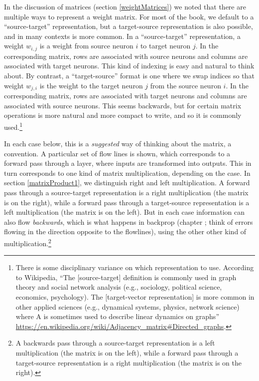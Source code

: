 In the discussion of matrices (section \ref{weightMatrices}) we noted that there are multiple ways to represent a weight matrix. For most of the book, we default to a ``source-target'' representation, but a target-source representation is also possible, and in many contexts is more common. In a ``source-target'' representation, a weight $w_{i, j}$ is a weight from source neuron $i$ to target neuron $j$. In the corresponding matrix, rows are associated with source neurons and columns are associated with target neurons. This kind of indexing is easy and natural to think about. By contrast, a ``target-source'' format is one where we swap indices so that weight $w_{j, i}$ is the weight to the target neuron $j$ from the source neuron $i$. In the corresponding matrix, rows are associated with target neurons and columns are associated with source neurons. This seems backwards, but for certain matrix operations is more natural and more compact to write, and so it is commonly used.\footnote{There is some disciplinary variance on which representation to use. According to Wikipedia, ``The [source-target] definition is commonly used in graph theory and social network analysis (e.g., sociology, political science, economics, psychology). The [target-vector representation] is more common in other applied sciences (e.g., dynamical systems, physics, network science) where A is sometimes used to describe linear dynamics on graphs'' \url{https://en.wikipedia.org/wiki/Adjacency_matrix\#Directed_graphs}.}

In each case below, this is a \emph{suggested} way of thinking about the matrix, a convention. A particular set of flow lines is shown, which corresponds to a forward pass through a layer, where inputs are transformed into outputs. This in turn corresponds to one kind of matrix multiplication, depending on the case. In section \ref{matrixProduct1}, we distinguish right and left multiplication. A forward pass through a source-target representation is a right multiplication (the matrix is on the right), while a forward pass through a target-source representation is a left multiplication (the matrix is on the left). But in each case information can also flow \emph{backwards}, which is what happens in backprop (chapter ; think of errors flowing in the direction opposite to the flowlines), using the other other kind of multiplication.\footnote{A backwards pass through a source-target representation is a left multiplication (the matrix is on the left), while a forward pass through a target-source representation is a right multiplication (the matrix is on the right).}

